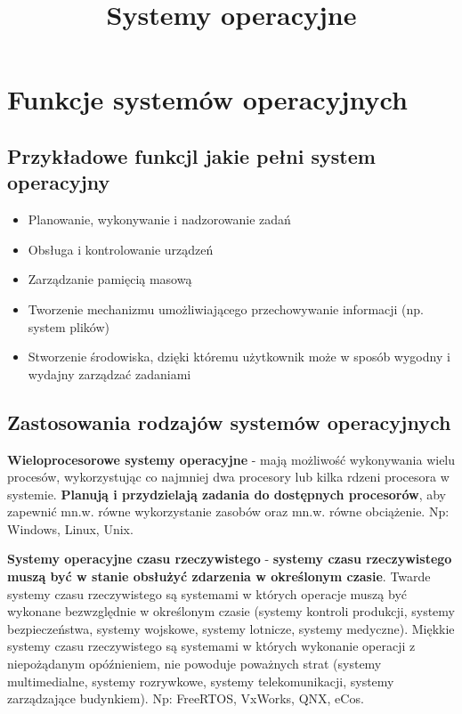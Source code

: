\documentclass{article}
\title{Systemy operacyjne}
\begin{document}
\maketitle

\newpage \tableofcontents

\section{Funkcje systemów operacyjnych}

\subsection{Przykładowe funkcjl jakie pełni system operacyjny}
\begin{itemize}
    \item Planowanie, wykonywanie i nadzorowanie zadań
    \item Obsługa i kontrolowanie urządzeń
    \item Zarządzanie pamięcią masową
    \item Tworzenie mechanizmu umożliwiającego przechowywanie informacji (np. system plików)
    \item Stworzenie środowiska, dzięki któremu użytkownik może w sposób wygodny i wydajny zarządzać zadaniami
\end{itemize}

\subsection{Zastosowania rodzajów systemów operacyjnych}
\textbf{Wieloprocesorowe systemy operacyjne} - mają możliwość wykonywania wielu procesów, wykorzystując co najmniej dwa procesory lub kilka rdzeni procesora w systemie. \textbf{Planują i przydzielają zadania do dostępnych procesorów}, aby zapewnić mn.w. równe wykorzystanie zasobów oraz mn.w. równe obciążenie. Np: Windows, Linux, Unix.

\textbf{Systemy operacyjne czasu rzeczywistego} - \textbf{systemy czasu rzeczywistego muszą być w stanie obsłużyć zdarzenia w określonym czasie}. Twarde systemy czasu rzeczywistego są systemami w których operacje muszą być wykonane bezwzględnie w określonym czasie (systemy kontroli produkcji, systemy bezpieczeństwa, systemy wojskowe, systemy lotnicze, systemy medyczne). Miękkie systemy czasu rzeczywistego są systemami w których wykonanie operacji z niepożądanym opóźnieniem, nie powoduje poważnych strat (systemy multimedialne, systemy rozrywkowe, systemy telekomunikacji, systemy zarządzające budynkiem). Np: FreeRTOS, VxWorks, QNX, eCos.
\end{document}
